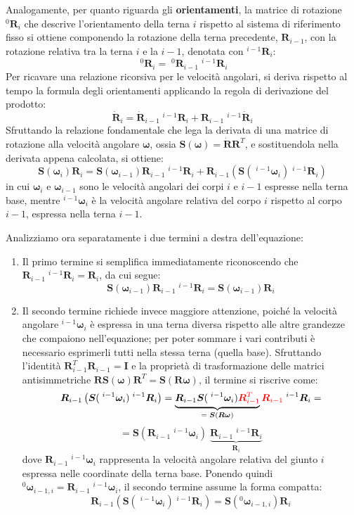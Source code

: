 \documentclass[11pt, a4paper]{report}
\begin{document}
Analogamente, per quanto riguarda gli \textbf{orientamenti}, la matrice di rotazione \(^{0}\bm{R}_i\) che descrive l'orientamento della terna \(i\) rispetto al sistema di riferimento fisso si ottiene componendo la rotazione della terna precedente, \(\bm{R}_{i-1}\), con la rotazione relativa tra la terna \(i\) e la \(i-1\), denotata con \(^{i-1}{\bm{R}}_i\):
\[
    \;^{0}\bm{R}_i = \;^{0}\bm{R}_{i-1} \;^{i-1}{\bm{R}}_i
\]
Per ricavare una relazione ricorsiva per le velocità angolari, si deriva rispetto al tempo la formula degli orientamenti applicando la regola di derivazione del prodotto:
\[
    \dot{\bm{R}}_i = \dot{\bm{R}}_{i-1} \;^{i-1}{\bm{R}}_i + \bm{R}_{i-1} \;^{i-1}\dot{{\bm{R}}}_i
\]
Sfruttando la relazione fondamentale che lega la derivata di una matrice di rotazione alla velocità angolare \(\bm{\omega}\), ossia \(\bm{S}(\bm{\omega}) = \dot{\bm{R}} \bm{R}^{T}\), e sostituendola nella derivata appena calcolata, si ottiene:
\[
    \bm{S}(\bm{\omega}_i)\bm{R}_i = \bm{S}(\bm{\omega}_{i-1})\bm{R}_{i-1}\;^{i-1}{\bm{R}}_i + \bm{R}_{i-1} \left( \bm{S}(\;^{i-1}{\bm{\omega}}_i) \;^{i-1}{\bm{R}}_i \right)
\]
in cui \(\bm{\omega}_i\) e \(\bm{\omega}_{i-1}\) sono le velocità angolari dei corpi \(i\) e \(i-1\) espresse nella terna base, mentre \(^{i-1}{\bm{\omega}}_i\) è la velocità angolare relativa del corpo \(i\) rispetto al corpo \(i-1\), espressa nella terna \(i-1\).

Analizziamo ora separatamente i due termini a destra dell'equazione:
\begin{enumerate}
    \item Il primo termine si semplifica immediatamente riconoscendo che \(\bm{R}_{i-1}\;^{i-1}{\bm{R}}_i = \bm{R}_i\), da cui segue:
    \[
        \bm{S}(\bm{\omega}_{i-1})\bm{R}_{i-1}\;^{i-1}{\bm{R}}_i = \bm{S}(\bm{\omega}_{i-1})\bm{R}_i
    \]
    \item Il secondo termine richiede invece maggiore attenzione, poiché la velocità angolare \(^{i-1}{\bm{\omega}}_i\) è espressa in una terna diversa rispetto alle altre grandezze che compaiono nell'equazione; per poter sommare i vari contributi è necessario esprimerli tutti nella stessa terna (quella base). Sfruttando l'identità \(\bm{R}_{i-1}^T\bm{R}_{i-1} = \bm{I}\) e la proprietà di trasformazione delle matrici antisimmetriche \(\bm{R}\bm{S}(\bm{\omega})\bm{R}^T = \bm{S}(\bm{R}\bm{\omega})\), il termine si riscrive come:
    \[
        \bm{R}_{i-1} \left( \bm{S}(\;^{i-1}{\bm{\omega}}_i) \;^{i-1}{\bm{R}}_i \right) = \underbrace{\bm{R}_{i-1} \bm{S}(\;^{i-1}{\bm{\omega}}_i) \textcolor{red}{\bm{R}_{i-1}^T}}_{= \; \bm{S}(\bm{R}\bm{\omega})}\textcolor{red}{\bm{R}_{i-1}}\;^{i-1}{\bm{R}}_i =
    \]
    \[
        = \bm{S}(\bm{R}_{i-1}\;^{i-1}{\bm{\omega}}_{i}) \; \underbrace{\bm{R}_{i-1} \;^{i-1}{\bm{R}}_i}_{\bm{R}_i}
    \]
    dove \(\bm{R}_{i-1}\;^{i-1}{\bm{\omega}}_{i}\) rappresenta la velocità angolare relativa del giunto \(i\) espressa nelle coordinate della terna base.
    \newpage
    Ponendo quindi \({}^{0}\bm{\omega}_{i-1,i} = \bm{R}_{i-1}\;^{i-1}{\bm{\omega}}_i\), il secondo termine assume la forma compatta:
    \[
        \bm{R}_{i-1} \left( \bm{S}(\;^{i-1}{\bm{\omega}}_i) \;^{i-1}{\bm{R}}_i \right) = \bm{S}({}^{0}\bm{\omega}_{i-1,i})\bm{R}_i
    \]
\end{enumerate}
\end{document}
